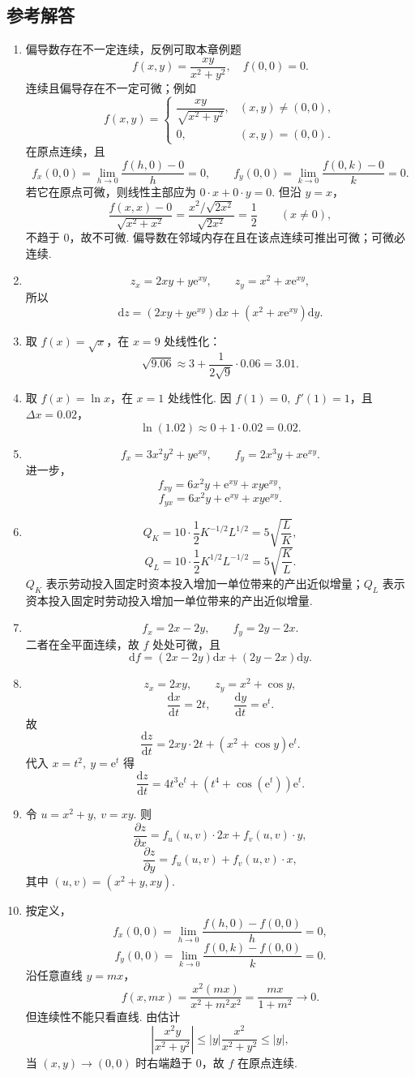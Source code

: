 \documentclass[fontset=fandol]{ctexart}
\newcommand{\dd}{\mathrm{d}}
\newcommand{\ee}{\mathrm{e}}
\begin{document}
\subsection{参考解答}
\begin{enumerate}[label=\textbf{练习\arabic*.},leftmargin=2.2em]
\item 偏导数存在不一定连续，反例可取本章例题
\[
f(x,y)=\frac{xy}{x^2+y^2},\quad f(0,0)=0.
\]
连续且偏导存在不一定可微；例如
\[
f(x,y)=
\begin{cases}
\dfrac{xy}{\sqrt{x^2+y^2}},&(x,y)\neq(0,0),\\[0.6em]
0,&(x,y)=(0,0).
\end{cases}
\]
在原点连续，且
\[
f_x(0,0)=\lim_{h\to0}\frac{f(h,0)-0}{h}=0,\qquad
f_y(0,0)=\lim_{k\to0}\frac{f(0,k)-0}{k}=0.
\]
若它在原点可微，则线性主部应为 $0\cdot x+0\cdot y=0$. 但沿 $y=x$，
\[
\frac{f(x,x)-0}{\sqrt{x^2+x^2}}
=\frac{x^2/\sqrt{2x^2}}{\sqrt{2x^2}}
=\frac12\qquad(x\neq0),
\]
不趋于 $0$，故不可微. 偏导数在邻域内存在且在该点连续可推出可微；可微必连续.
\item
\[
z_x=2xy+y\ee^{xy},\qquad z_y=x^2+x\ee^{xy},
\]
所以
\[
\dd z=(2xy+y\ee^{xy})\dd x+(x^2+x\ee^{xy})\dd y.
\]
\item 取 $f(x)=\sqrt{x}$，在 $x=9$ 处线性化：
\[
\sqrt{9.06}\approx3+\frac{1}{2\sqrt9}\cdot0.06=3.01.
\]
\item 取 $f(x)=\ln x$，在 $x=1$ 处线性化. 因 $f(1)=0,\ f'(1)=1$，且 $\Delta x=0.02$，
\[
\ln(1.02)\approx0+1\cdot0.02=0.02.
\]
\item
\[
f_x=3x^2y^2+y\ee^{xy},\qquad
f_y=2x^3y+x\ee^{xy}.
\]
进一步，
\[
f_{xy}=6x^2y+\ee^{xy}+xy\ee^{xy},
\]
\[
f_{yx}=6x^2y+\ee^{xy}+xy\ee^{xy}.
\]
\item
\[
Q_K=10\cdot\frac12K^{-1/2}L^{1/2}
=5\sqrt{\frac{L}{K}},
\]
\[
Q_L=10\cdot\frac12K^{1/2}L^{-1/2}
=5\sqrt{\frac{K}{L}}.
\]
$Q_K$ 表示劳动投入固定时资本投入增加一单位带来的产出近似增量；$Q_L$ 表示资本投入固定时劳动投入增加一单位带来的产出近似增量.
\item
\[
f_x=2x-2y,\qquad f_y=2y-2x.
\]
二者在全平面连续，故 $f$ 处处可微，且
\[
\dd f=(2x-2y)\dd x+(2y-2x)\dd y.
\]
\item
\[
z_x=2xy,\qquad z_y=x^2+\cos y,
\]
\[
\frac{\dd x}{\dd t}=2t,\qquad \frac{\dd y}{\dd t}=\ee^t.
\]
故
\[
\frac{\dd z}{\dd t}=2xy\cdot2t+(x^2+\cos y)\ee^t.
\]
代入 $x=t^2,\ y=\ee^t$ 得
\[
\frac{\dd z}{\dd t}=4t^3\ee^t+(t^4+\cos(\ee^t))\ee^t.
\]
\item 令 $u=x^2+y,\ v=xy$. 则
\[
\frac{\partial z}{\partial x}=f_u(u,v)\cdot2x+f_v(u,v)\cdot y,
\]
\[
\frac{\partial z}{\partial y}=f_u(u,v)+f_v(u,v)\cdot x,
\]
其中 $(u,v)=(x^2+y,xy)$.
\item 按定义，
\[
f_x(0,0)=\lim_{h\to0}\frac{f(h,0)-f(0,0)}{h}=0,
\]
\[
f_y(0,0)=\lim_{k\to0}\frac{f(0,k)-f(0,0)}{k}=0.
\]
沿任意直线 $y=mx$，
\[
f(x,mx)=\frac{x^2(mx)}{x^2+m^2x^2}
=\frac{mx}{1+m^2}\to0.
\]
但连续性不能只看直线. 由估计
\[
\left|\frac{x^2y}{x^2+y^2}\right|
\leq |y|\frac{x^2}{x^2+y^2}\leq |y|,
\]
当 $(x,y)\to(0,0)$ 时右端趋于 $0$，故 $f$ 在原点连续.
\end{enumerate}
\end{document}
